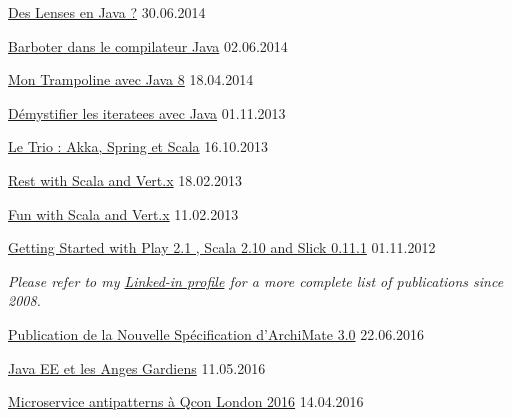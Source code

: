 \documentclass[10pt,a4paper]{article}
\begin{document}
\headedsection
  {\href{http://www.infoq.com/fr/articles/lenses-en-java}{ Des Lenses en Java ?}}
  {\textsc{30.06.2014}}

\headedsection
  {\href{http://www.infoq.com/fr/articles/compilateur-java}{ Barboter dans le compilateur Java}}
  {\textsc{02.06.2014}}
  
\headedsection
  {\href{http://www.infoq.com/fr/articles/trampoline-java8}{ Mon Trampoline avec Java 8}}
  {\textsc{18.04.2014}}

\headedsection
  {\href{http://www.infoq.com/fr/articles/demystifier-iteratees-java}{ Démystifier les iteratees avec Java}}
  {\textsc{01.11.2013}}

\headedsection
  {\href{http://www.infoq.com/fr/articles/trio-akka-spring-scala}{ Le Trio : Akka, Spring et Scala}}
  {\textsc{16.10.2013}}


\headedsection
  {\href{http://blog.zenika.com/index.php?post/2013/02/12/Rest-with-Scala-and-Vert.x}{ Rest with Scala and Vert.x}}
  {\textsc{18.02.2013}}

\headedsection
  {\href{http://blog.zenika.com/index.php?post/2013/02/11/fun-with-scala-and-vert-x}{ Fun with Scala and Vert.x}}
  {\textsc{11.02.2013}}

\headedsection
  {\href{http://java.dzone.com/articles/getting-started-play-21-scala}{Getting Started with Play 2.1 , Scala 2.10 and Slick 0.11.1}}
  {\textsc{01.11.2012}}
  
\vspace{-0.2em}
\begin{center}
  \emph{\small Please refer to my \href{http://www.linkedin.com/in/ouertani}{Linked-in profile} for a more complete list of publications since 2008.}
\end{center}



\spacedhrule{0em}{-0.4em}


\headedsection
  {\href{https://www.infoq.com/fr/news/2016/06/archimate-3-0}{Publication de la Nouvelle Spécification d’ArchiMate 3.0}}
  {\textsc{22.06.2016}}

\headedsection
  {\href{https://www.infoq.com/fr/news/2016/05/java-ee-anges-gardiens}{Java EE et les Anges Gardiens}}
  {\textsc{11.05.2016}}
  
\headedsection
  {\href{https://www.infoq.com/fr/news/2016/03/microservice-antipatterns-qcon}{Microservice antipatterns à Qcon London 2016}}
  {\textsc{14.04.2016}}   
  
\end{document}
